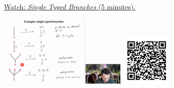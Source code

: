 
\begin{minipage}{10cm}
    \href{https://act4e-spring21.netlify.app/videos/spring2021-operads-b:single-typed-branches.html}{Watch: \emph{Single Typed Branches} (5 minutes).}
        
    \href{https://act4e-spring21.netlify.app/videos/spring2021-operads-b:single-typed-branches.html}{\includegraphics[height=3.5cm]{spring2021-operads-b:single-typed-branches/thumbnails.jpg}}
    \href{https://act4e-spring21.netlify.app/videos/spring2021-operads-b:single-typed-branches.html}{\includegraphics[height=2.5cm]{spring2021-operads-b:single-typed-branches/qrcode.png}}
\end{minipage}

